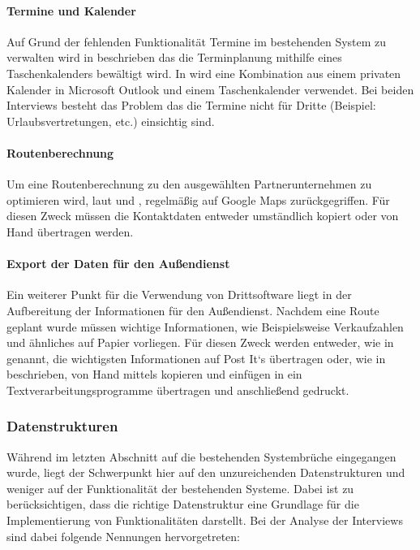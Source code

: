 \documentclass[Bachelorarbeit.tex]{subfiles}
\begin{document}
\paragraph{Termine und Kalender}
Auf Grund der fehlenden Funktionalität Termine im bestehenden System zu verwalten wird in  beschrieben das die Terminplanung mithilfe eines Taschenkalenders bewältigt wird. 
In  wird eine Kombination aus einem privaten Kalender in Microsoft Outlook und einem Taschenkalender verwendet. 
Bei beiden Interviews besteht das Problem das die Termine nicht für Dritte (Beispiel: Urlaubsvertretungen, etc.) einsichtig sind.

\paragraph{Routenberechnung}
Um eine Routenberechnung zu den ausgewählten Partnerunternehmen zu optimieren wird, laut  und , regelmäßig auf Google Maps zurückgegriffen. 
Für diesen Zweck müssen die Kontaktdaten entweder umständlich kopiert oder von Hand übertragen werden.

\paragraph{Export der Daten für den Außendienst}
Ein weiterer Punkt für die Verwendung von Drittsoftware liegt in der Aufbereitung der Informationen für den Außendienst.
Nachdem eine Route geplant wurde müssen wichtige Informationen, wie Beispielsweise Verkaufzahlen und ähnliches auf Papier vorliegen. 
Für diesen Zweck werden entweder, wie in  genannt, die wichtigsten Informationen auf Post It`s übertragen oder, wie in  beschrieben, von Hand mittels kopieren und einfügen in ein Textverarbeitungsprogramme übertragen und anschließend gedruckt.

\subsubsection*{Datenstrukturen}
\label{interviewsAnalyseDatenstrukturen}
Während im letzten Abschnitt auf die bestehenden Systembrüche eingegangen wurde, liegt der Schwerpunkt hier auf den unzureichenden Datenstrukturen und weniger auf der Funktionalität der bestehenden Systeme. 
Dabei ist zu berücksichtigen, dass die richtige Datenstruktur eine Grundlage für die Implementierung von Funktionalitäten darstellt. 
Bei der Analyse der Interviews sind dabei folgende Nennungen hervorgetreten:
\end{document}
